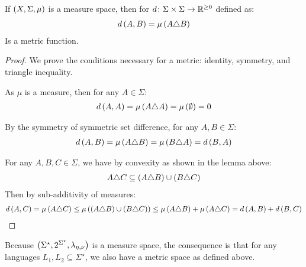 \documentclass[12pt]{article}
\begin{document}
\begin{theorem}
  If \(\left(X, \Sigma, \mu\right)\) is a measure space,
  then for \(d \colon \Sigma \times \Sigma \to \mathbb{R}^{\geq 0}\) defined as:
  \begin{align*}
    d\left(A, B\right) = \mu\left(A \triangle B\right)
  \end{align*}
  Is a metric function.
\end{theorem}
\begin{proof}
  We prove the conditions necessary for a metric:
  identity, symmetry, and triangle inequality.

      As \(\mu\) is a measure, then for any \(A \in \Sigma\):
      \begin{align*}
        d\left(A, A\right)
          = \mu\left(A \triangle A\right)
          = \mu\left(\emptyset\right) = 0
      \end{align*}

      By the symmetry of symmetric set difference, for any \(A, B \in \Sigma\):
      \begin{align*}
        d\left(A, B\right)
          = \mu\left(A \triangle B\right)
          = \mu\left(B \triangle A\right)
          = d\left(B, A\right)
      \end{align*}

      For any \(A, B, C \in \Sigma\),
      we have by convexity as shown in the lemma above:
      \begin{align*}
        A \triangle C \subseteq
          \left(A \triangle B\right) \cup \left(B \triangle C\right)
      \end{align*}
      Then by sub-additivity of measures:
      \begin{align*}
        d\left(A, C\right)
          = \mu\left(A \triangle C\right)
          \leq \mu\left(
                \left(A \triangle B\right) \cup \left(B \triangle C\right)\right)
          \leq
          \mu\left(A \triangle B\right) + \mu\left(A \triangle C\right)
          = d\left(A, B\right) + d\left(B, C\right)
      \end{align*}
\end{proof}


Because \(\left(\Sigma^\star, 2^{\Sigma^\star}, \lambda_{\eta, \nu}\right)\)
is a measure space,
the consequence is that for any 
languages \(L_1, L_2 \subseteq \Sigma^\star\),
we also have a metric space as defined above.
\end{document}
